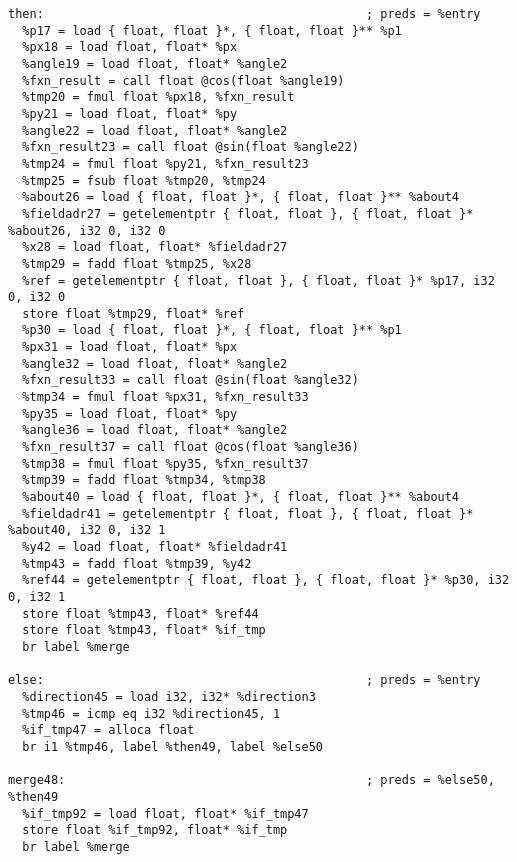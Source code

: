 \documentclass[main.tex]{subfiles}
\begin{document}
{\begin{lstlisting}
then:                                             ; preds = %entry
  %p17 = load { float, float }*, { float, float }** %p1
  %px18 = load float, float* %px
  %angle19 = load float, float* %angle2
  %fxn_result = call float @cos(float %angle19)
  %tmp20 = fmul float %px18, %fxn_result
  %py21 = load float, float* %py
  %angle22 = load float, float* %angle2
  %fxn_result23 = call float @sin(float %angle22)
  %tmp24 = fmul float %py21, %fxn_result23
  %tmp25 = fsub float %tmp20, %tmp24
  %about26 = load { float, float }*, { float, float }** %about4
  %fieldadr27 = getelementptr { float, float }, { float, float }* %about26, i32 0, i32 0
  %x28 = load float, float* %fieldadr27
  %tmp29 = fadd float %tmp25, %x28
  %ref = getelementptr { float, float }, { float, float }* %p17, i32 0, i32 0
  store float %tmp29, float* %ref
  %p30 = load { float, float }*, { float, float }** %p1
  %px31 = load float, float* %px
  %angle32 = load float, float* %angle2
  %fxn_result33 = call float @sin(float %angle32)
  %tmp34 = fmul float %px31, %fxn_result33
  %py35 = load float, float* %py
  %angle36 = load float, float* %angle2
  %fxn_result37 = call float @cos(float %angle36)
  %tmp38 = fmul float %py35, %fxn_result37
  %tmp39 = fadd float %tmp34, %tmp38
  %about40 = load { float, float }*, { float, float }** %about4
  %fieldadr41 = getelementptr { float, float }, { float, float }* %about40, i32 0, i32 1
  %y42 = load float, float* %fieldadr41
  %tmp43 = fadd float %tmp39, %y42
  %ref44 = getelementptr { float, float }, { float, float }* %p30, i32 0, i32 1
  store float %tmp43, float* %ref44
  store float %tmp43, float* %if_tmp
  br label %merge

else:                                             ; preds = %entry
  %direction45 = load i32, i32* %direction3
  %tmp46 = icmp eq i32 %direction45, 1
  %if_tmp47 = alloca float
  br i1 %tmp46, label %then49, label %else50

merge48:                                          ; preds = %else50, %then49
  %if_tmp92 = load float, float* %if_tmp47
  store float %if_tmp92, float* %if_tmp
  br label %merge


\end{lstlisting}}
\end{document}
